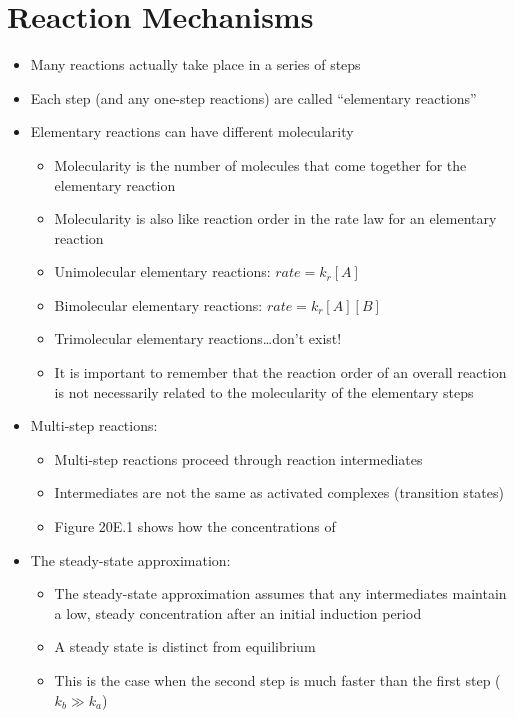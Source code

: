 \documentclass[12pt, openany, letterpaper]{memoir}
\begin{document}
\section{Reaction Mechanisms}
\begin{itemize}
	\item Many reactions actually take place in a series of steps
	\item Each step (and any one-step reactions) are called “elementary reactions”
	\item Elementary reactions can have different molecularity
	\begin{itemize}
		\item Molecularity is the number of molecules that come together for the elementary reaction
		\item Molecularity is also like reaction order in the rate law for an elementary reaction
		\item Unimolecular elementary reactions: \hspace{2em}$rate=k_r[A]$
		\item Bimolecular elementary reactions: \hspace{2em}$rate=k_r[A][B]$
		\item Trimolecular elementary reactions\ldots don't exist!
		\item It is important to remember that the reaction order of an overall reaction is not necessarily related to the molecularity of the elementary steps
	\end{itemize}
	\item Multi-step reactions:
	\begin{itemize}
		\item Multi-step reactions proceed through reaction intermediates
		\item Intermediates are not the same as activated complexes (transition states)
		\item Figure 20E.1 shows how the concentrations of 
	\end{itemize}
	\item The steady-state approximation:
	\begin{itemize}
		\item The steady-state approximation assumes that any intermediates maintain a low, steady concentration after an initial induction period
		\item A steady state is distinct from equilibrium
		\item This is the case when the second step is much faster than the first step ($k_b\gg k_a$)

\end{itemize}
\end{itemize}
\end{document}
